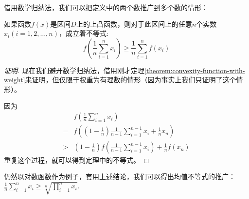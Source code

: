 借用数学归纳法，我们可以把定义中的两个数推广到多个数的情形：
\begin{theorem}
  \label{theorem:convexity-function-multile}
如果函数$f(x)$是区间$D$上的上凸函数，则对于此区间上的任意$n$个实数$x_i(i=1,2,\ldots,n)$，成立着不等式:
\begin{equation}
  \label{eq:convexity-function-multile}
  f(\frac{1}{n}\sum_{i=1}^nx_i) \geqslant \frac{1}{n}\sum_{i=1}^nf(x_i)
\end{equation}
\end{theorem}

\begin{proof}[证明]
  现在我们避开数学归纳法，借用刚才定理\ref{theorem:convexity-function-with-weight}来证明，但仅限于权重为有理数的情形（因为事实上我们只证明了这个情形）。

因为
\begin{equation*}
  \begin{split}
    & f \left ( \frac{1}{n}\sum_{i=1}^nx_i \right) \\
 = & f \left( (1-\frac{1}{n}) \frac{1}{n-1}\sum_{i=1}^{n-1}x_i + \frac{1}{n}x_n \right) \\
 > & (1-\frac{1}{n}) f \left( \frac{1}{n-1}\sum_{i=1}^{n-1}x_i \right) + \frac{1}{n} f(x_n)
  \end{split}
\end{equation*}
重复这个过程，就可以得到定理中的不等式。
\end{proof}

仍然以对数函数作为例子，套用上述结论，我们可以得出均值不等式的推广：$\frac{1}{n}\sum_{i=1}^nx_i \geqslant \sqrt[n]{\prod_{i=1}^nx_i}$.

